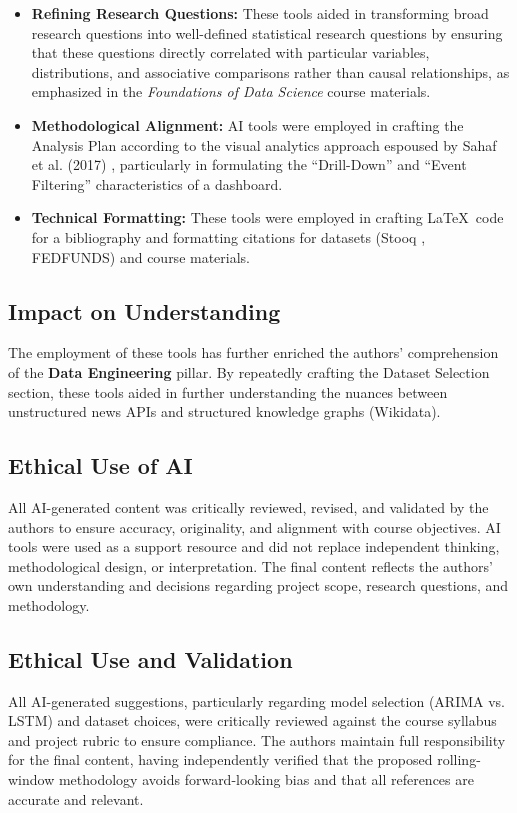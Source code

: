 \documentclass{article}
\begin{document}
\begin{itemize}
    \item \textbf{Refining Research Questions:} These tools aided in transforming broad research questions into well-defined statistical research questions by ensuring that these questions directly correlated with particular variables, distributions, and associative comparisons rather than causal relationships, as emphasized in the \textit{Foundations of Data Science} course materials.
    
    \item \textbf{Methodological Alignment:} AI tools were employed in crafting the Analysis Plan according to the visual analytics approach espoused by Sahaf et al. (2017) \cite{sahaf2017}, particularly in formulating the ``Drill-Down'' and ``Event Filtering'' characteristics of a dashboard.
    
    \item \textbf{Technical Formatting:} These tools were employed in crafting \LaTeX\ code for a bibliography and formatting citations for datasets (Stooq \cite{stooq}, FEDFUNDS) and course materials.
\end{itemize}

\subsection{Impact on Understanding}
The employment of these tools has further enriched the authors' comprehension of the \textbf{Data Engineering} pillar. By repeatedly crafting the Dataset Selection section, these tools aided in further understanding the nuances between unstructured news APIs and structured knowledge graphs (Wikidata).

\subsection{Ethical Use of AI}
All AI-generated content was critically reviewed, revised, and validated by the authors to ensure accuracy, originality, and alignment with course objectives. AI tools were used as a support resource and did not replace independent thinking, methodological design, or interpretation. The final content reflects the authors' own understanding and decisions regarding project scope, research questions, and methodology.

\subsection{Ethical Use and Validation}
All AI-generated suggestions, particularly regarding model selection (ARIMA vs. LSTM) and dataset choices, were critically reviewed against the course syllabus and project rubric to ensure compliance. The authors maintain full responsibility for the final content, having independently verified that the proposed rolling-window methodology avoids forward-looking bias and that all references are accurate and relevant.
\end{document}
